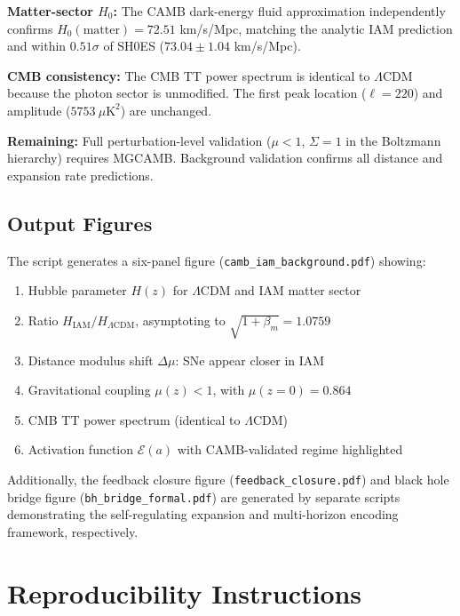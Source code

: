\documentclass[11pt]{article}
\begin{document}
\textbf{Matter-sector $H_0$:} The CAMB dark-energy fluid approximation independently confirms $H_0(\text{matter}) = 72.51$ km/s/Mpc, matching the analytic IAM prediction and within $0.51\sigma$ of SH0ES ($73.04 \pm 1.04$ km/s/Mpc).

\textbf{CMB consistency:} The CMB TT power spectrum is identical to $\Lambda$CDM because the photon sector is unmodified. The first peak location ($\ell = 220$) and amplitude ($5753~\mu\text{K}^2$) are unchanged.

\textbf{Remaining:} Full perturbation-level validation ($\mu < 1$, $\Sigma = 1$ in the Boltzmann hierarchy) requires MGCAMB. Background validation confirms all distance and expansion rate predictions.

\subsection{Output Figures}

The script generates a six-panel figure (\texttt{camb\_iam\_background.pdf}) showing:
\begin{enumerate}
    \item[(a)] Hubble parameter $H(z)$ for $\Lambda$CDM and IAM matter sector
    \item[(b)] Ratio $H_\text{IAM}/H_{\Lambda\text{CDM}}$, asymptoting to $\sqrt{1 + \beta_m} = 1.0759$
    \item[(c)] Distance modulus shift $\Delta\mu$: SNe appear closer in IAM
    \item[(d)] Gravitational coupling $\mu(z) < 1$, with $\mu(z=0) = 0.864$
    \item[(e)] CMB TT power spectrum (identical to $\Lambda$CDM)
    \item[(f)] Activation function $\mathcal{E}(a)$ with CAMB-validated regime highlighted
\end{enumerate}

Additionally, the feedback closure figure (\texttt{feedback\_closure.pdf}) and black hole bridge figure (\texttt{bh\_bridge\_formal.pdf}) are generated by separate scripts demonstrating the self-regulating expansion and multi-horizon encoding framework, respectively.

\section{Reproducibility Instructions}
\end{document}
